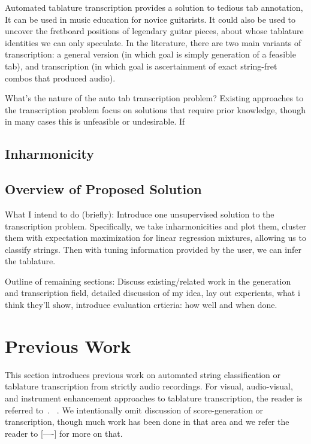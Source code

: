 \documentclass[12pt]{cmuthesis}
\begin{document}
Automated tablature transcription provides a solution to tedious tab annotation, It can be used in music education for novice guitarists. It could also be used to uncover the fretboard positions of legendary guitar pieces, about whose tablature identities we can only speculate. In the literature, there are two main variants of transcription: a general version (in which goal is simply generation of a feasible tab), and transcription (in which goal is ascertainment of exact string-fret combos that produced audio).

What's the nature of the auto tab transcription problem? Existing approaches to the transcription problem focus on solutions that require prior knowledge, though in many cases this is unfeasible or undesirable. If
\section{Inharmonicity}

\section{Overview of Proposed Solution}
What I intend to do (briefly): Introduce one unsupervised solution to the transcription problem. Specifically, we take inharmonicities and plot them, cluster them with expectation maximization for linear regression mixtures, allowing us to classify strings. Then with tuning information provided by the user, we can infer the tablature.

Outline of remaining sections: Discuss existing/related work in the generation and transcription field, detailed discussion of my idea, lay out experients, what i think they'll show, introduce evaluation crtieria: how well and when done.

\singlespacing


\chapter{Previous Work}
\doublespacing
This section introduces previous work on automated string classification or tablature transcription from strictly audio recordings. For visual, audio-visual, and instrument enhancement approaches to tablature transcription, the reader is referred to~\cite{ogrady2009, hrybyk2010}. ~\cite{abesser2012}. We intentionally omit discussion of score-generation or transcription, though much work has been done in that area and we refer the reader to [----] for more on that. \cite{barbanchoa2012,barbanchoi2012}
\cite{barbancho2009}
\end{document}
